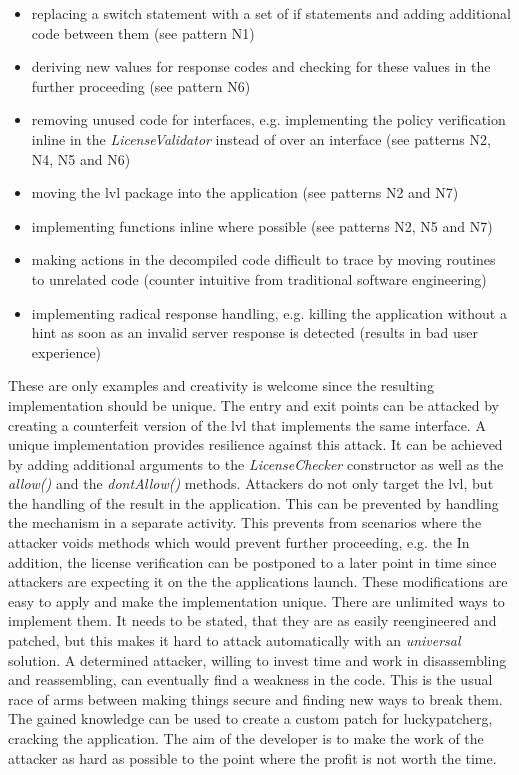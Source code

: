 \begin{itemize}
\item replacing a switch statement with a set of if statements and adding additional code between them (see pattern N1)
\item deriving new values for response codes and checking for these values in the further proceeding (see pattern N6)
\item removing unused code for interfaces, e.g. implementing the policy verification inline in the \textit{LicenseValidator} instead of over an interface (see patterns N2, N4, N5 and N6)
\item moving the \gls{lvl} package into the application (see patterns N2 and N7)
\item implementing functions inline where possible (see patterns N2, N5 and N7)
\item making actions in the decompiled code difficult to trace by moving routines to unrelated code (counter intuitive from traditional software engineering)
\item implementing radical response handling, e.g. killing the application without a hint as soon as an invalid server response is detected (results in bad user experience)
\end{itemize}
These are only examples and creativity is welcome since the resulting implementation should be unique. \cite{developersSecuring}
\newline
The entry and exit points can be attacked by creating a counterfeit version of the \gls{lvl} that implements the same interface.
A unique implementation provides resilience against this attack.
It can be achieved by adding additional arguments to the \textit{LicenseChecker} constructor as well as the \textit{allow()} and the \textit{dontAllow()} methods. \cite{developersSecuring}
\newline
Attackers do not only target the \gls{lvl}, but the handling of the result in the application.
This can be prevented by handling the mechanism in a separate activity.
This prevents from scenarios where the attacker voids methods which would prevent further proceeding, e.g. the
In addition, the license verification can be postponed to a later point in time since attackers are expecting it on the the applications launch. \cite{developersSecuring}
\newline
These modifications are easy to apply and make the implementation unique.
There are unlimited ways to implement them.
It needs to be stated, that they are as easily reengineered and patched, but this makes it hard to attack automatically with an \textit{universal} solution.
A determined attacker, willing to invest time and work in disassembling and reassembling, can eventually find a weakness in the code.
This is the usual race of arms between making things secure and finding new ways to break them.
The gained knowledge can be used to create a custom patch for \gls{luckypatcherg}, cracking the application.
The aim of the developer is to make the work of the attacker as hard as possible to the point where the profit is not worth the time. \cite{developersSecuring}

